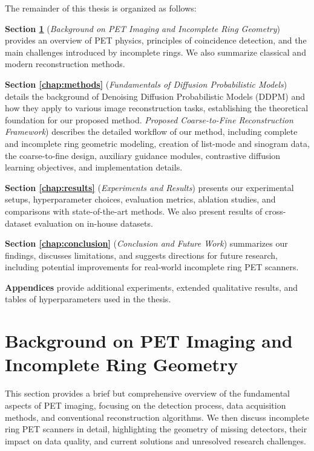 \documentclass[
reprint,
superscriptaddress,
nofootinbib,
amsmath,amssymb,
aps,
prd,
]{revtex4-2}
\begin{document}
The remainder of this thesis is organized as follows:

\textbf{Section \ref{chap:background}} (\emph{Background on PET Imaging and Incomplete Ring Geometry}) provides an overview of PET physics, principles of coincidence detection, and the main challenges introduced by incomplete rings. We also summarize classical and modern reconstruction methods.

\textbf{Section \ref{chap:methods}} (\emph{Fundamentals of Diffusion Probabilistic Models}) details the background of Denoising Diffusion Probabilistic Models (DDPM) and how they apply to various image reconstruction tasks, establishing the theoretical foundation for our proposed method. \emph{Proposed Coarse-to-Fine Reconstruction Framework}) describes the detailed workflow of our method, including complete and incomplete ring geometric modeling, creation of list-mode and sinogram data, the coarse-to-fine design, auxiliary guidance modules, contrastive diffusion learning objectives, and implementation details.

\textbf{Section \ref{chap:results}} (\emph{Experiments and Results}) presents our experimental setups, hyperparameter choices, evaluation metrics, ablation studies, and comparisons with state-of-the-art methods. We also present results of cross-dataset evaluation on in-house datasets.

\textbf{Section \ref{chap:conclusion}} (\emph{Conclusion and Future Work}) summarizes our findings, discusses limitations, and suggests directions for future research, including potential improvements for real-world incomplete ring PET scanners.

\textbf{Appendices} provide additional experiments, extended qualitative results, and tables of hyperparameters used in the thesis.

\section{Background on PET Imaging and Incomplete Ring Geometry}
\label{chap:background}


This section provides a brief but comprehensive overview of the fundamental aspects of PET imaging, focusing on the detection process, data acquisition methods, and conventional reconstruction algorithms. We then discuss incomplete ring PET scanners in detail, highlighting the geometry of missing detectors, their impact on data quality, and current solutions and unresolved research challenges.
\end{document}
